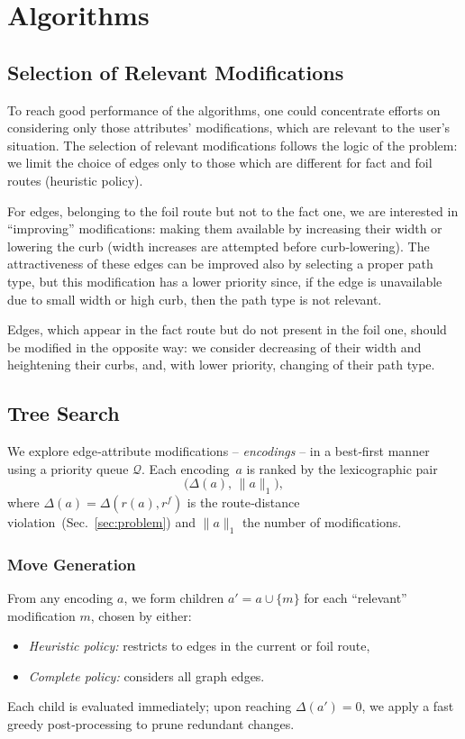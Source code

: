 \documentclass{article}
\begin{document}
\section{Algorithms}
\label{sec:algorithms}

\subsection{Selection of Relevant Modifications}
To reach good performance of the algorithms, one could concentrate efforts on considering only those attributes' modifications, which are relevant to the user's situation.
The selection of relevant modifications follows the logic of the problem: we limit the choice of edges only to those which are different for fact and foil routes (heuristic policy).

For edges, belonging to the foil route but not to the fact one, we are interested in ``improving'' modifications: making them available by increasing their width or lowering the curb (width increases are attempted before curb‑lowering).
The attractiveness of these edges can be improved also by selecting a proper path type, but this modification has a lower priority since, if the edge is unavailable due to small width or high curb, then the path type is not relevant.

Edges, which appear in the fact route but do not present in the foil one, should be modified in the opposite way: we consider decreasing of their width and heightening their curbs, and, with lower priority, changing of their path type.


\subsection{Tree Search}
\label{sec:tree-search}

We explore edge‐attribute modifications -- \emph{encodings} -- in a best‐first manner using a  priority queue $\mathcal Q$.  Each encoding~$a$ is ranked by the lexicographic pair
\[
  \bigl(\Delta(a),\,\|a\|_1\bigr),
\]
where $\Delta(a)=\Delta(r(a),r^f)$ is the route‐distance violation~(Sec.~\ref{sec:problem}) and $\|a\|_1$ the number of modifications.

\subsubsection{Move Generation}
From any encoding $a$, we form children $a'=a\cup\{m\}$ for each “relevant” modification $m$, chosen by either:
\begin{itemize}
  \item \emph{Heuristic policy:} restricts to edges in the current or foil route,
  \item \emph{Complete policy:} considers all graph edges.
\end{itemize}
Each child is evaluated immediately; upon reaching $\Delta(a')=0$, we apply a fast greedy post‑processing to prune redundant changes.
\end{document}
